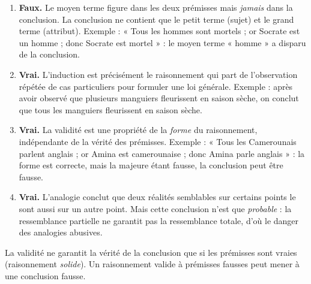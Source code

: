 \documentclass[11pt]{article}
\newcommand{\cle}[1]{{\popxbold\color{popdark}#1}}
\begin{document}
\begin{corrige}
\begin{enumerate}
\item \textbf{Faux.} Le moyen terme figure dans les deux prémisses mais \emph{jamais} dans la conclusion. La conclusion ne contient que le petit terme (sujet) et le grand terme (attribut). Exemple : « Tous les hommes sont mortels ; or Socrate est un homme ; donc Socrate est mortel » : le moyen terme « homme » a disparu de la conclusion.
\item \textbf{Vrai.} L'\cle{induction} est précisément le raisonnement qui part de l'observation répétée de cas particuliers pour formuler une loi générale. Exemple : après avoir observé que plusieurs manguiers fleurissent en saison sèche, on conclut que tous les manguiers fleurissent en saison sèche.
\item \textbf{Vrai.} La \cle{validité} est une propriété de la \emph{forme} du raisonnement, indépendante de la vérité des prémisses. Exemple : « Tous les Camerounais parlent anglais ; or Amina est camerounaise ; donc Amina parle anglais » : la forme est correcte, mais la majeure étant fausse, la conclusion peut être fausse.
\item \textbf{Vrai.} L'\cle{analogie} conclut que deux réalités semblables sur certains points le sont aussi sur un autre point. Mais cette conclusion n'est que \emph{probable} : la ressemblance partielle ne garantit pas la ressemblance totale, d'où le danger des analogies abusives.
\end{enumerate}
\end{corrige}

\begin{attention}
La validité ne garantit la vérité de la conclusion que si les prémisses sont vraies (raisonnement \emph{solide}). Un raisonnement valide à prémisses fausses peut mener à une conclusion fausse.
\end{attention}
\end{document}
